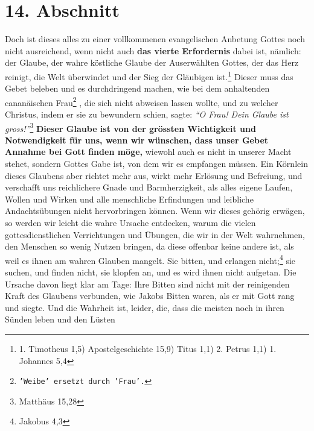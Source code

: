 \section{14. Abschnitt} \label{kap6_ab14}

Doch ist dieses alles zu einer vollkommenen evangelischen Anbetung Gottes noch
nicht ausreichend, wenn nicht auch \textbf{das vierte Erfordernis} dabei ist,
nämlich:
der Glaube, der wahre köstliche Glaube der Auserwählten Gottes, der das Herz
reinigt, die Welt überwindet und der Sieg der Gläubigen ist.\footnote{1.
Timotheus 1,5) Apostelgeschichte 15,9) Titus 1,1) 2. Petrus 1,1) 1.
Johannes 5,4}
Dieser muss das
Gebet beleben und es durchdringend machen, wie bei dem anhaltenden cananäischen
Frau\footnote{\texttt{'Weibe' ersetzt durch 'Frau'.}}
 
, die sich
nicht abweisen lassen wollte, und zu welcher Christus, indem er
sie zu bewundern schien, sagte:
\textit{"`O Frau! Dein Glaube ist gross!"'}\footnote{Matthäus 15,28}
\textbf{Dieser Glaube ist von der grössten
Wichtigkeit
und Notwendigkeit für uns, wenn wir wünschen, dass unser Gebet Annahme bei Gott
finden möge,} wiewohl auch es nicht in unserer Macht stehet, sondern Gottes Gabe
ist, von dem wir es empfangen müssen. Ein Körnlein dieses Glaubens aber richtet
mehr aus, wirkt mehr Erlösung und Befreiung, und verschafft uns
reichlichere
Gnade und Barmherzigkeit, als alles eigene Laufen, Wollen und Wirken und alle
menschliche Erfindungen und leibliche Andachtsübungen nicht hervorbringen
können. Wenn wir dieses gehörig erwägen, so werden wir leicht die wahre Ursache
entdecken, warum die vielen gottesdienstlichen Verrichtungen und Übungen, die
wir in der Welt wahrnehmen, den Menschen so wenig Nutzen bringen, da diese
offenbar keine andere ist, als weil es ihnen am wahren Glauben mangelt. Sie
bitten, und erlangen nicht;\footnote{Jakobus 4,3}
sie suchen, und finden nicht, sie
klopfen an, und es wird ihnen nicht aufgetan. Die Ursache davon liegt klar am
Tage: Ihre Bitten sind nicht mit der reinigenden Kraft des Glaubens verbunden,
wie Jakobs  Bitten waren, als er mit Gott rang und
siegte. Und die Wahrheit
ist, leider, die, dass die meisten noch in ihren Sünden leben und den Lüsten
